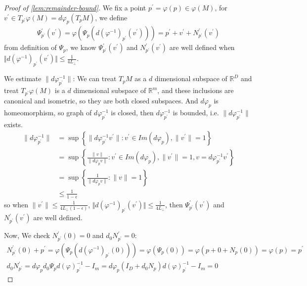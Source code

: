 \begin{proof}[Proof of \cref{lem:remainder-bound}]
We fix a point $p^\prime=\varphi(p) \in \varphi(M)$, for $v^\prime \in T_{p^\prime}\varphi(M)=d\varphi_p(T_pM)$, we define 
\begin{align}
	\Psi^\prime_{p^\prime}(v^\prime)=\varphi(\Psi_p(d(\varphi^{-1})_{p^\prime} (v^\prime)))=p^\prime+v^\prime+N^\prime_{p^\prime}(v^\prime)
\end{align}
from definition of $\Psi_p$, we know $\Psi^\prime_{p^\prime}(v^\prime)$ and $N^\prime_{p^\prime}(v^\prime)$ are well defined when $\Vert d(\varphi^{-1})_{p^\prime}(v^\prime)\Vert \leq \frac{1}{4L_\perp}$. 

We estimate $\|d \varphi^{-1}_{p^\prime}\|$: We can treat $T_p M$ as a
$d$ dimensional subspace of $\mathbb{R}^D$ and treat $T_{p^\prime}
\varphi(M)$ is a  $d$ dimensional subspace of $\mathbb{R}^m$, and these
inclusions are canonical and isometric, so they are both closed
subspaces. And $d \varphi_p$ is homeomorphism, so graph of $d
\varphi^{-1}_{p^\prime}$ is closed, then $d \varphi^{-1}_{p^\prime}$
is bounded, i.e. $\|d \varphi^{-1}_{p^\prime}\|$ exists.
\begin{align}
	\|d \varphi^{-1}_{p^\prime}\|&=\sup \left\{\|d\varphi^{-1}_{p^\prime} v^\prime \|: v^\prime \in Im(d\varphi_p), \|v^\prime\| = 1\right\} \\
	&=\sup \left\{\frac{\|v\|}{\|d\varphi_p v\|}: v^\prime \in Im(d\varphi_p), \|v^\prime\| = 1, v=d \varphi^{-1}_{p^\prime} v^\prime\right\} \\
	&=\sup \left\{\frac{1}{\|d\varphi_p v\|}: \|v\| = 1\right\} \\
	&\leq \frac{1}{1-\epsilon}
\end{align}
so when $\|v^\prime\| \leq \frac{1}{4L_\perp(1-\epsilon)}$, $\Vert d(\varphi^{-1})_{p^\prime}(v^\prime)\Vert \leq \frac{1}{4L_\perp}$, then $\Psi^\prime_{p^\prime}(v^\prime)$ and $N^\prime_{p^\prime}(v^\prime)$ are well defined.


Now, We check $N^\prime_{p^\prime}(0)=0$ and $d_0N^\prime_{p^\prime}=0$:
\begin{align}
	N^\prime_{p^\prime}(0)+p^\prime=\varphi(\Psi_p(d(\varphi^{-1})_{p^\prime}(0)))=\varphi(\Psi_p(0))=\varphi(p+0+N_p(0))=\varphi(p)=p^\prime\\
	d_0N^\prime_{p^\prime}=d\varphi_p d_0\Psi_p d(\varphi)_{p^\prime}^{-1}-I_m=d\varphi_p(I_D+d_0N_p) d(\varphi)_{p^\prime}^{-1}-I_m=0
\end{align}


\end{proof}
